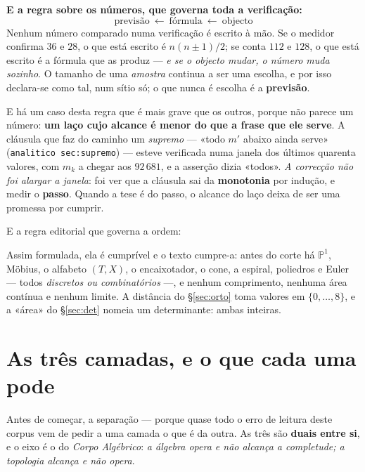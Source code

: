 \documentclass[11pt,a4paper]{article}
\newcommand{\code}[1]{\texttt{\small #1}}
\begin{document}
\medskip
\noindent\textbf{E a regra sobre os números, que governa toda a verificação:}
\[
\boxed{\;\text{previsão}\ \longleftarrow\ \text{fórmula}\ \longleftarrow\ \text{objecto}\;}
\]
Nenhum número comparado numa verificação é escrito à mão. Se o medidor confirma $36$ e
$28$, o que está escrito é $n(n\pm1)/2$; se conta $112$ e $128$, o que está escrito é a
fórmula que as produz --- \emph{e se o objecto mudar, o número muda sozinho}. O tamanho
de uma \emph{amostra} continua a ser uma escolha, e por isso declara-se como tal, num
sítio só; o que nunca é escolha é a \textbf{previsão}.

\medskip
\noindent E há um caso desta regra que é mais grave que os outros, porque não parece um
número: \textbf{um laço cujo alcance é menor do que a frase que ele serve}. A cláusula
que faz do caminho um \emph{supremo} --- «todo $m'$ abaixo ainda serve»
(\code{analitico sec:supremo}) --- esteve verificada numa janela dos últimos quarenta valores,
com $m_k$ a chegar aos $92\,681$, e a asserção dizia «todos». \emph{A correcção não foi
alargar a janela}: foi ver que a cláusula sai da \textbf{monotonia} por indução, e medir
o \textbf{passo}. Quando a tese é do passo, o alcance do laço deixa de ser uma promessa
por cumprir.

\medskip
\noindent E a regra editorial que governa a ordem:
\begin{center}
\end{center}
Assim formulada, ela é cumprível e o texto cumpre-a: antes do corte há
$\mathbb{P}^1$, Möbius, o alfabeto $(T,X)$, o encaixotador, o cone, a espiral,
poliedros e Euler --- todos \emph{discretos ou combinatórios} ---, e nenhum
comprimento, nenhuma área contínua e nenhum limite. A distância do
\S\ref{sec:orto} toma valores em $\{0,\ldots,8\}$, e a «área» do
\S\ref{sec:det} nomeia um determinante: ambas inteiras.

\section{As três camadas, e o que cada uma pode}\label{sec:camadas}

Antes de começar, a separação --- porque quase todo o erro de leitura deste corpus vem de
pedir a uma camada o que é da outra. As três são \textbf{duais entre si}, e o eixo é o do
\emph{Corpo Algébrico}: \emph{a álgebra opera e não alcança a completude; a topologia
alcança e não opera}.
\end{document}
